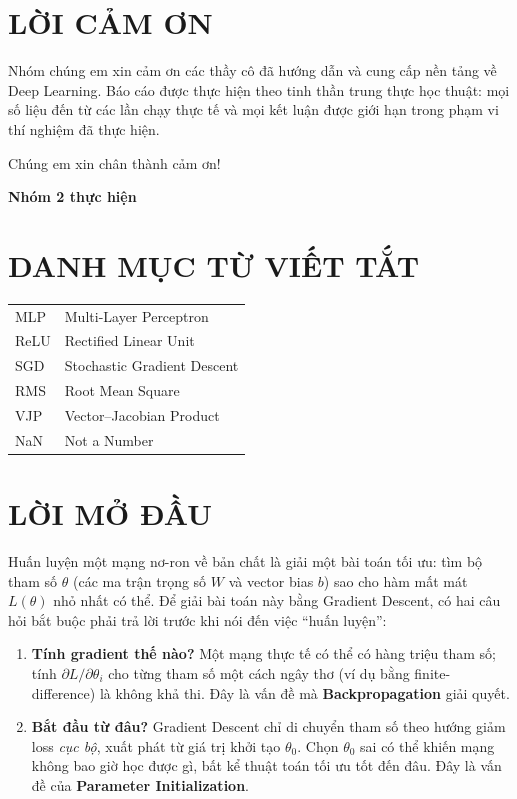 \documentclass[12pt,a4paper]{report}
\begin{document}
\chapter*{LỜI CẢM ƠN}
Nhóm chúng em xin cảm ơn các thầy cô đã hướng dẫn và cung cấp nền tảng về Deep Learning. Báo cáo được thực hiện theo tinh thần trung thực học thuật: mọi số liệu đến từ các lần chạy thực tế và mọi kết luận được giới hạn trong phạm vi thí nghiệm đã thực hiện.

Chúng em xin chân thành cảm ơn!

\hfill{\textbf{Nhóm 2 thực hiện}}

\chapter*{DANH MỤC TỪ VIẾT TẮT}
\begin{tabular}{ll}
MLP & Multi-Layer Perceptron \\
ReLU & Rectified Linear Unit \\
SGD & Stochastic Gradient Descent \\
RMS & Root Mean Square \\
VJP & Vector--Jacobian Product \\
NaN & Not a Number \\
\end{tabular}

\tableofcontents

\listoffigures
\listoftables


\chapter*{LỜI MỞ ĐẦU}

Huấn luyện một mạng nơ-ron về bản chất là giải một bài toán tối ưu: tìm bộ
tham số $\theta$ (các ma trận trọng số $W$ và vector bias $b$) sao cho hàm
mất mát $L(\theta)$ nhỏ nhất có thể. Để giải bài toán này bằng Gradient
Descent, có hai câu hỏi bắt buộc phải trả lời trước khi nói đến việc ``huấn
luyện'':

\begin{enumerate}
\item \textbf{Tính gradient thế nào?} Một mạng thực tế có thể có hàng triệu
  tham số; tính $\partial L/\partial\theta_i$ cho từng tham số một cách
  ngây thơ (ví dụ bằng finite-difference) là không khả thi. Đây là vấn đề
  mà \textbf{Backpropagation} giải quyết.
\item \textbf{Bắt đầu từ đâu?} Gradient Descent chỉ di chuyển tham số theo
  hướng giảm loss \emph{cục bộ}, xuất phát từ giá trị khởi tạo $\theta_0$.
  Chọn $\theta_0$ sai có thể khiến mạng không bao giờ học được gì, bất kể
  thuật toán tối ưu tốt đến đâu. Đây là vấn đề của
  \textbf{Parameter Initialization}.
\end{enumerate}
\end{document}
